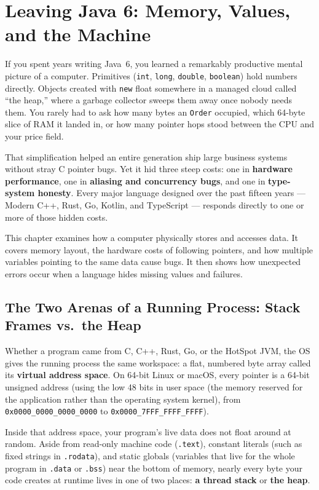 \chapter{Leaving Java 6: Memory, Values, and the Machine}
\label{ch:leaving-java6}

If you spent years writing Java~6, you learned a remarkably productive mental picture of a computer. Primitives (\texttt{int}, \texttt{long}, \texttt{double}, \texttt{boolean}) hold numbers directly. Objects created with \texttt{new} float somewhere in a managed cloud called ``the heap,'' where a garbage collector sweeps them away once nobody needs them. You rarely had to ask how many bytes an \texttt{Order} occupied, which 64-byte slice of RAM it landed in, or how many pointer hops stood between the CPU and your price field.

That simplification helped an entire generation ship large business systems without stray C pointer bugs. Yet it hid three steep costs: one in \textbf{hardware performance}, one in \textbf{aliasing and concurrency bugs}, and one in \textbf{type-system honesty}. Every major language designed over the past fifteen years --- Modern C++, Rust, Go, Kotlin, and TypeScript --- responds directly to one or more of those hidden costs.

This chapter examines how a computer physically stores and accesses data. It covers memory layout, the hardware costs of following pointers, and how multiple variables pointing to the same data cause bugs. It then shows how unexpected errors occur when a language hides missing values and failures.

\chapterline

\section{The Two Arenas of a Running Process: Stack Frames vs.\ the Heap}
\label{ch01:stack-vs-heap}

Whether a program came from C, C++, Rust, Go, or the HotSpot JVM, the OS gives the running process the same workspace: a flat, numbered byte array called its \textbf{virtual address space}. On 64-bit Linux or macOS, every pointer is a 64-bit unsigned address (using the low 48 bits in user space (the memory reserved for the application rather than the operating system kernel), from \texttt{0x0000\_0000\_0000\_0000} to \texttt{0x0000\_7FFF\_FFFF\_FFFF}).

Inside that address space, your program's live data does not float around at random. Aside from read-only machine code (\texttt{.text}), constant literals (such as fixed strings in \texttt{.rodata}), and static globals (variables that live for the whole program in \texttt{.data} or \texttt{.bss}) near the bottom of memory, nearly every byte your code creates at runtime lives in one of two places: \textbf{a thread stack} or \textbf{the heap}.

